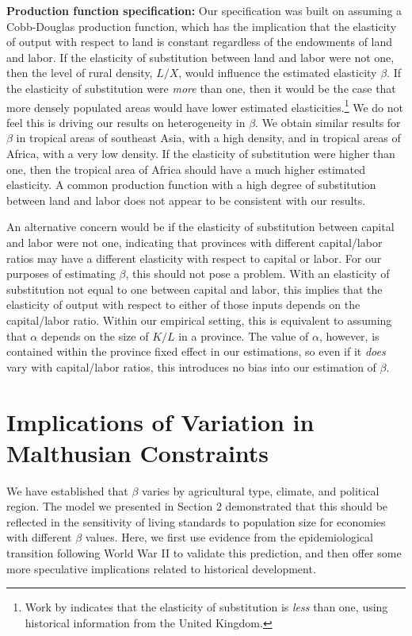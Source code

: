 \documentclass[11pt]{article}
\begin{document}
\vspace{.5cm}\noindent\textbf{Production function specification:} Our specification was built on assuming a Cobb-Douglas production function, which has the implication that the elasticity of output with respect to land is constant regardless of the endowments of land and labor. If the elasticity of substitution between land and labor were not one, then the level of rural density, $L/X$, would influence the estimated elasticity $\beta$. If the elasticity of substitution were \textit{more} than one, then it would be the case that more densely populated areas would have lower estimated elasticities.\footnote{Work by \citet{wilde2012} indicates that the elasticity of substitution is \textit{less} than one, using historical information from the United Kingdom.} We do not feel this is driving our results on heterogeneity in $\beta$. We obtain similar results for $\beta$ in tropical areas of southeast Asia, with a high density, and in tropical areas of Africa, with a very low density. If the elasticity of substitution were higher than one, then the tropical area of Africa should have a much higher estimated elasticity. A common production function with a high degree of substitution between land and labor does not appear to be consistent with our results.

An alternative concern would be if the elasticity of substitution between capital and labor were not one, indicating that provinces with different capital/labor ratios may have a different elasticity with respect to capital or labor. For our purposes of estimating $\beta$, this should not pose a problem. With an elasticity of substitution not equal to one between capital and labor, this implies that the elasticity of output with respect to either of those inputs depends on the capital/labor ratio. Within our empirical setting, this is equivalent to assuming that $\alpha$ depends on the size of $K/L$ in a province. The value of $\alpha$, however, is contained within the province fixed effect in our estimations, so even if it \textit{does} vary with capital/labor ratios, this introduces no bias into our estimation of $\beta$.

\section{Implications of Variation in Malthusian Constraints}\label{SEC_implications}
We have established that $\beta$ varies by agricultural type, climate, and political region. The model we presented in Section 2 demonstrated that this should be reflected in the sensitivity of living standards to population size for economies with different $\beta$ values. Here, we first use evidence from the epidemiological transition following World War II to validate this prediction, and then offer some more speculative implications related to historical development.
\end{document}

